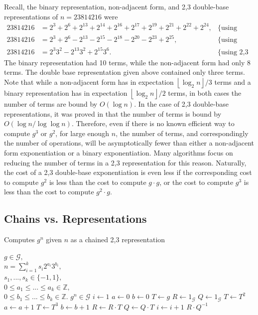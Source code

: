\documentclass{ucalgthes1}
\theoremstyle{plain}
\theoremstyle{definition}
\newcommand{\ZZ}{\mathbb{Z}}
\newcommand{\floor}[1]{\left\lfloor #1 \right\rfloor}
\begin{document}
Recall, the binary representation, non-adjacent form, and 2,3 double-base representations of $n=23814216$ were
\begin{align*}
	23814216 &= 2^3+2^6+2^{13}+2^{14}+2^{16}+2^{17}+2^{19}+2^{21}+2^{22}+2^{24}, & \mbox{\{using binary\}} \\
	23814216 &= 2^3+2^6-2^{13}-2^{15}-2^{18}-2^{20}-2^{23}+2^{25}, & \mbox{\{using NAF\}} \\
	23814216 &= 2^3 3^2 -2^{13} 3^2 +2^{15} 3^6. & \mbox{\{using 2,3 DBNS\}}
\end{align*}
The binary representation had 10 terms, while the non-adjacent form had only 8 terms.  The double base representation given above contained only three terms.  Note that while a non-adjacent form has in expectation $\floor{\log_2 n}/3$ terms and a binary representation has in expectation $\floor{\log_2 n}/2$ terms, in both cases the number of terms are bound by $O(\log n)$.  In the case of 2,3 double-base representations, it was proved in \cite{Ciet2005} that the number of terms is bound by $O(\log n / \log \log n)$.  Therefore, even if there is no known efficient way to compute $g^3$ or $g^2$, for large enough $n$, the number of terms, and correspondingly the number of operations, will be asymptotically fewer than either a non-adjacent form exponentiation or a binary exponentiation.  Many algorithms focus on reducing the number of terms in a 2,3 representation for this reason.   Naturally, the cost of a 2,3 double-base exponentiation is even less if the corresponding cost to compute $g^2$ is less than the cost to compute $g \cdot g$, or the cost to compute $g^3$ is less than the cost to compute $g^2 \cdot g$. 


\bigbreak
\subsection{Chains vs. Representations}

\begin{algorithm}[h]
\caption{Computes $g^n$ given $n$ as a chained 2,3 representation}\label{alg:expWithChain}
\begin{algorithmic}[1]
\REQUIRE $g \in \mathcal G,$ \\
$n = \sum_{i=1}^k s_i2^{a_i}3^{b_i},$ \\
$s_1,...,s_k \in \{-1, 1\},$ \\
$0 \le a_1 \le ...\le a_k \in \ZZ,$ \\
$0 \le b_1 \le ... \le b_k \in \ZZ.$
\ENSURE $g^n \in \mathcal G$
\STATE $i \gets 1$
\STATE $a \gets 0$ 
\STATE $b \gets 0$ 
\STATE $T \gets g$ 
\STATE $R \gets 1_{\mathcal G}$ 
\STATE $Q \gets 1_{\mathcal G}$ 
		\STATE $T \gets T^2$
		\STATE $a \gets a + 1$
	\ENDWHILE
		\STATE $T \gets T^3$
		\STATE $b \gets b + 1$
	\ENDWHILE
		\STATE $R \gets R \cdot T$
	\ELSE
		\STATE $Q \gets Q \cdot T$
	\ENDIF
	\STATE $i \gets i + 1$
\ENDWHILE
\RETURN $R \cdot Q^{-1}$
\end{algorithmic}
\end{algorithm}
\end{document}
